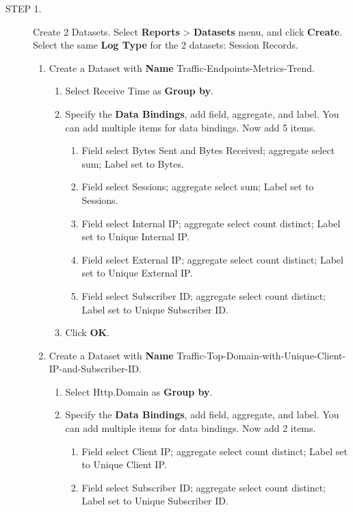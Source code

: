 \begin{description}
    \item[STEP 1.]	Create 2 Datasets. Select \textbf{Reports} > \textbf{Datasets} menu, and click \textbf{Create}. Select the same \textbf{Log Type} for the 2 datasets: Session Records.
    \begin{enumerate}
        \item Create a Dataset with \textbf{Name} Traffic-Endpoints-Metrics-Trend.
        \begin{enumerate}
            \item	Select Receive Time as \textbf{Group by}. 
            \item	Specify the \textbf{Data Bindings}, add field, aggregate, and label. You can add multiple items for data bindings. Now add 5 items. 
            \begin{enumerate}
                \item	Field select Bytes Sent and Bytes Received; aggregate select sum; Label set to Bytes. 
                \item	Field select Sessions; aggregate select sum; Label set to Sessions.
                \item	Field select Internal IP; aggregate select count distinct; Label set to Unique Internal IP. 
                \item	Field select External IP; aggregate select count distinct; Label set to Unique External IP.
                \item	Field select Subscriber ID; aggregate select count distinct; Label set to Unique Subscriber ID.
            \end{enumerate}
            \item	Click \textbf{OK}.
        \end{enumerate}
        \item Create a Dataset with \textbf{Name} Traffic-Top-Domain-with-Unique-Client-IP-and-Subscriber-ID.
        \begin{enumerate}
            \item	Select Http.Domain as \textbf{Group by}. 
            \item	Specify the \textbf{Data Bindings}, add field, aggregate, and label. You can add multiple items for data bindings. Now add 2 items. 
            \begin{enumerate}
                \item	Field select Client IP; aggregate select count distinct; Label set to Unique Client IP. 
                \item	Field select Subscriber ID; aggregate select count distinct; Label set to Unique Subscriber ID.

\end{enumerate}
\end{enumerate}
\end{enumerate}
\end{description}
